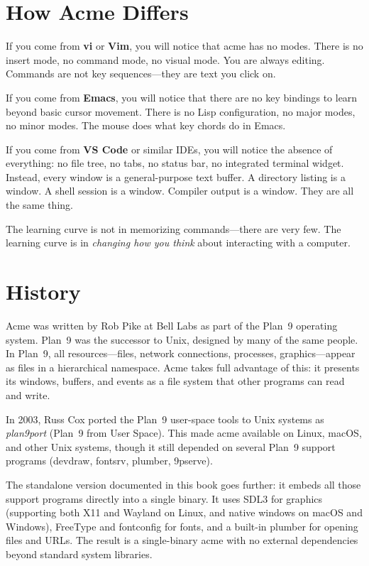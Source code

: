\section{How Acme Differs}

If you come from \textbf{vi} or \textbf{Vim}, you will notice that acme
has no modes.  There is no insert mode, no command mode, no visual mode.
You are always editing.  Commands are not key sequences---they are text
you click on.

If you come from \textbf{Emacs}, you will notice that there are no key
bindings to learn beyond basic cursor movement.  There is no Lisp
configuration, no major modes, no minor modes.  The mouse does what
key chords do in Emacs.

If you come from \textbf{VS Code} or similar IDEs, you will notice the
absence of everything: no file tree, no tabs, no status bar, no
integrated terminal widget.  Instead, every window is a general-purpose
text buffer.  A directory listing is a window.  A shell session is a
window.  Compiler output is a window.  They are all the same thing.

The learning curve is not in memorizing commands---there are very few.
The learning curve is in \emph{changing how you think} about interacting
with a computer.

\section{History}

Acme was written by Rob Pike at Bell Labs as part of the Plan~9
operating system.  Plan~9 was the successor to Unix, designed by many
of the same people.  In Plan~9, all resources---files, network
connections, processes, graphics---appear as files in a hierarchical
namespace.  Acme takes full advantage of this: it presents its windows,
buffers, and events as a file system that other programs can read and
write.

In 2003, Russ Cox ported the Plan~9 user-space tools to Unix systems
as \emph{plan9port} (Plan~9 from User Space).  This made acme available
on Linux, macOS, and other Unix systems, though it still depended on
several Plan~9 support programs (devdraw, fontsrv, plumber, 9pserve).

The standalone version documented in this book goes further: it embeds
all those support programs directly into a single binary.  It uses SDL3
for graphics (supporting both X11 and Wayland on Linux, and native
windows on macOS and Windows), FreeType and fontconfig for fonts, and a
built-in plumber for opening files and URLs.  The result is a
single-binary acme with no external dependencies beyond standard system
libraries.

